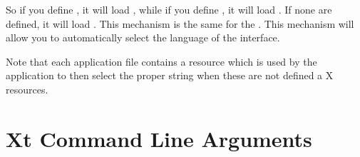 So if you define , it will load ,
while if you define , it will load
. If none are defined, it will load . This mechanism
is the same for the . This mechanism will allow you to
automatically select the language of the interface.

Note that each application file contains a  resource which is
used by the application to then select the proper string when these are not
defined a X resources.



\section{Xt Command Line Arguments}


